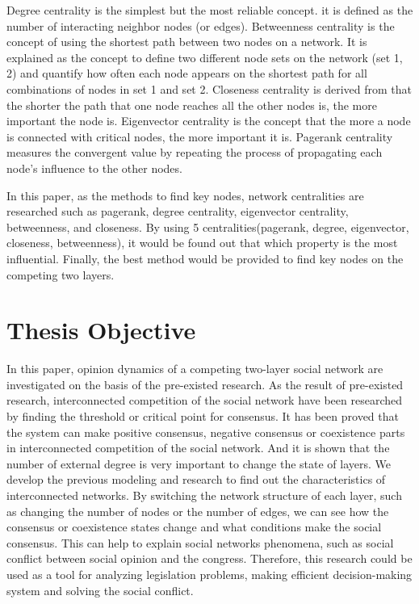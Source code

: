 Degree centrality is the simplest but the most reliable concept. it is defined as the number of interacting neighbor nodes (or edges). Betweenness centrality is the concept of using the shortest path between two nodes on a network. It is explained as the concept to  define two different node sets on the network (set 1, 2) and quantify how often each node appears on the shortest path for all combinations of nodes in set 1 and set 2. Closeness centrality is derived from that the shorter the path that one node reaches all the other nodes is, the more important the node is. Eigenvector centrality is the concept that the more a node is connected with critical nodes, the more important it is. Pagerank centrality measures the convergent value by repeating the process of propagating each node's influence to the other nodes.    

In this paper, as the methods to find key nodes, network centralities are researched such as pagerank, degree centrality, eigenvector centrality, betweenness, and closeness.\cite{francisco2019, bianconi2018} By using 5 centralities(pagerank, degree, eigenvector, closeness, betweenness), it would be found out that which property is the most influential. Finally, the best method would be provided to find key nodes on the competing two layers. 

\section{Thesis Objective}
In this paper, opinion dynamics of a competing two-layer social network are investigated on the basis of the pre-existed research\cite{alvarez2016, gomez2015, diep2017, rocca2014}. As the result of pre-existed research, interconnected competition of the social network have been researched by finding the threshold or critical point for consensus\cite{alvarez2016, gomez2015, diep2017}. It has been proved that the system can make positive consensus, negative consensus or coexistence parts in interconnected competition of the social network\cite{alvarez2016}. And it is shown that the number of external degree is very important to change the state of layers\cite{gomez2015}. We develop the previous modeling and research to find out the characteristics of interconnected networks. By switching the network structure of each layer, such as changing the number of nodes or the number of edges, we can see how the consensus or coexistence states change and what conditions make the social consensus. This can help to explain social networks phenomena, such as social conflict between social opinion and the congress. Therefore, this research could be used as a tool for analyzing legislation problems, making efficient decision-making system and solving the social conflict. 

